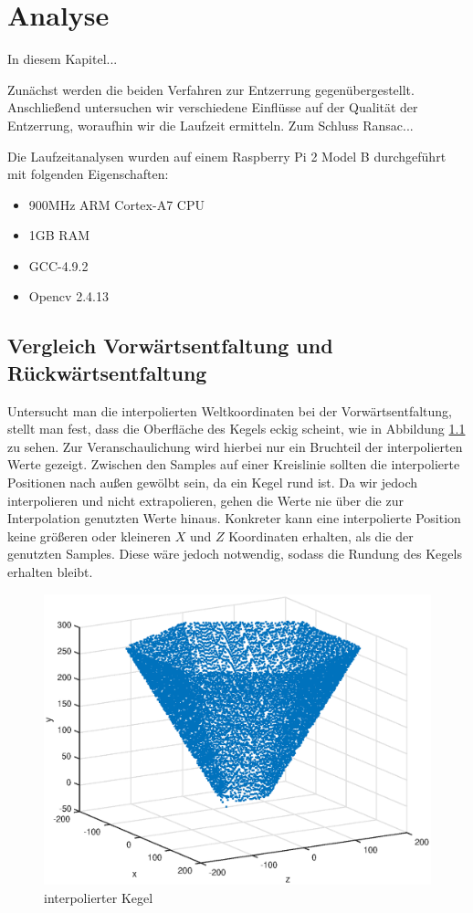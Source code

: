\chapter{Analyse}
\label{ch:analysis}
In diesem Kapitel...

Zunächst werden die beiden Verfahren zur Entzerrung gegenübergestellt. Anschließend untersuchen wir verschiedene Einflüsse auf der Qualität der Entzerrung, woraufhin wir die Laufzeit ermitteln. 
Zum Schluss Ransac...

Die Laufzeitanalysen wurden auf einem Raspberry Pi 2 Model B durchgeführt mit folgenden Eigenschaften:
\begin{itemize}
	\item 900MHz ARM Cortex-A7 CPU
	\item 1GB RAM
	\item GCC-4.9.2
	\item Opencv 2.4.13
\end{itemize}


\section{Vergleich Vorwärtsentfaltung und Rückwärtsentfaltung}
Untersucht man die interpolierten Weltkoordinaten bei der Vorwärtsentfaltung, stellt man fest, dass die Oberfläche des Kegels eckig scheint, wie in Abbildung \ref{fig:3DInterpol} zu sehen. Zur Veranschaulichung wird hierbei nur ein Bruchteil der interpolierten Werte gezeigt. Zwischen den Samples auf einer Kreislinie sollten die interpolierte Positionen nach außen gewölbt sein, da ein Kegel rund ist. Da wir jedoch interpolieren und nicht extrapolieren, gehen die Werte nie über die zur Interpolation genutzten Werte hinaus. Konkreter kann eine interpolierte Position keine größeren oder kleineren $X$ und $Z$ Koordinaten erhalten, als die der genutzten Samples. Diese wäre jedoch notwendig, sodass die Rundung des Kegels erhalten bleibt.

\begin{figure}[!htb]
	\centering
	\includegraphics[scale=.7]{images/3d_interpol.eps}
	\caption{interpolierter Kegel}
	\label{fig:3DInterpol}
\end{figure}

